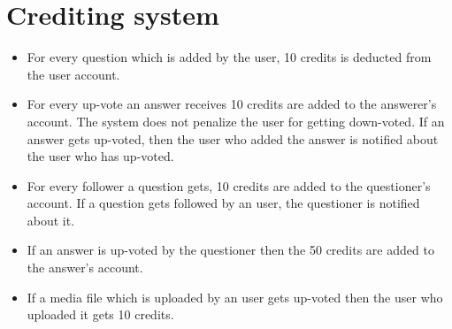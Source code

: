 \documentclass{article}
\begin{document}
\section{Crediting system}
\begin{itemize}
\item For every question which is added by the user, 10 credits is deducted from the user account.
\item For every up-vote an answer receives 10 credits are added to the answerer's account. The system does not penalize the user for getting down-voted. If an answer gets up-voted, then the user who added the answer is notified about the user who has up-voted. 
\item For every follower a question gets, 10 credits are added to the questioner's account. If a question gets followed by an user, the questioner is notified about it.
\item If an answer is up-voted by the questioner then the 50 credits are added to the answer's account.
\item If a media file which is uploaded by an user gets up-voted then the user who uploaded it gets 10 credits.
\end{itemize}
\end{document}
